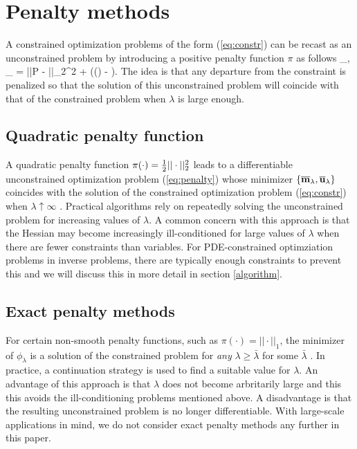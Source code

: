 \documentclass{iopart}
\begin{document}
\section{Penalty methods}
\label{penalty}
A constrained optimization problems of the form (\ref{eq:constr})
can be recast as an unconstrained problem by introducing a positive penalty function $\pi$ as follows
\bq
\label{eq:penalty}
\min_{,} \Phi_{\lambda} = ||P - ||_2^2 + \lambda\pi(() - ).
\eq
The idea is that any departure from the constraint is penalized so that the solution of this 
unconstrained problem will coincide with that of the constrained problem when $\lambda$ is large enough.

\subsection{Quadratic penalty function}
A quadratic penalty function $\pi(\cdot) = {\textstyle\frac{1}{2}}||\cdot||_2^2$ leads to a differentiable 
unconstrained optimization problem (\ref{eq:penalty}) whose minimizer $\{\overline{\mathbf{m}}_{\lambda},\overline{\mathbf{u}}_{\lambda}\}$ coincides with the solution
of the constrained optimization problem (\ref{eq:constr}) when $\lambda \uparrow \infty$ \cite[Thm. 17.1]{Nocedal}. 
Practical algorithms rely on repeatedly solving the unconstrained problem for increasing values of $\lambda$.
A common concern with this approach is that the Hessian may become increasingly ill-conditioned 
for large values of $\lambda$ when there are fewer constraints than variables. For PDE-constrained 
optimziation problems in inverse problems, there are typically enough constraints to prevent this and we will
discuss this in more detail in section \ref{algorithm}.

\subsection{Exact penalty methods}
For certain non-smooth penalty functions, such as $\pi(\cdot) = ||\cdot||_1$, the minimizer of $\phi_{\lambda}$
is a solution of the constrained problem for \emph{any} $\lambda \geq \bar{\lambda}$ for some $\bar{\lambda}$
\cite[Thm. 17.3]{Nocedal}. In practice, a continuation
strategy is used to find a suitable value for $\lambda$. An advantage of this approach is that $\lambda$ does
not become arbritarily large and this this avoids the ill-conditioning problems mentioned above. A disadvantage
is that the resulting unconstrained problem is no longer differentiable. 
With large-scale applications in mind, we do not consider exact penalty methods any further in this paper.
\end{document}
